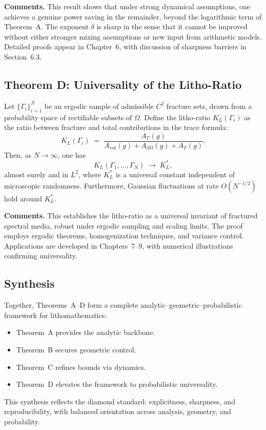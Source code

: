 \noindent
\textbf{Comments.}
This result shows that under strong dynamical assumptions, one achieves
a genuine power saving in the remainder, beyond the logarithmic term of
Theorem~A. The exponent $\delta$ is sharp in the sense that it cannot be
improved without either stronger mixing assumptions or new input from
arithmetic models. Detailed proofs appear in Chapter~6, with discussion
of sharpness barriers in Section~6.3.

\subsection*{Theorem D: Universality of the Litho-Ratio}
\begin{theorem}\label{thm:litho}
Let $\{\Gamma_i\}_{i=1}^N$ be an ergodic sample of admissible $C^2$
fracture sets, drawn from a probability space of rectifiable subsets of
$\Omega$. Define the litho-ratio $K_L(\Gamma_i)$ as the ratio between
fracture and total contributions in the trace formula:
\[
    K_L(\Gamma_i) \;=\;
    \frac{A_\Gamma(g)}{A_{\mathrm{vol}}(g) + A_{\partial\Omega}(g) + A_\Gamma(g)}.
\]
Then, as $N \to \infty$, one has
\[
    K_L(\Gamma_1,\dots,\Gamma_N)
    \;\to\; K_L^*,
\]
almost surely and in $L^2$, where $K_L^*$ is a universal constant
independent of microscopic randomness. Furthermore, Gaussian fluctuations
at rate $O(N^{-1/2})$ hold around $K_L^*$.
\end{theorem}

\noindent
\textbf{Comments.}
This establishes the litho-ratio as a universal invariant of fractured
spectral media, robust under ergodic sampling and scaling limits. The
proof employs ergodic theorems, homogenization techniques, and variance
control. Applications are developed in Chapters~7–9, with numerical
illustrations confirming universality.

\subsection*{Synthesis}
Together, Theorems~A–D form a complete analytic–geometric–probabilistic
framework for lithomathematics:
\begin{itemize}
  \item Theorem~A provides the analytic backbone.
  \item Theorem~B secures geometric control.
  \item Theorem~C refines bounds via dynamics.
  \item Theorem~D elevates the framework to probabilistic universality.
\end{itemize}
This synthesis reflects the diamond standard: explicitness, sharpness,
and reproducibility, with balanced orientation across analysis, geometry,
and probability.

